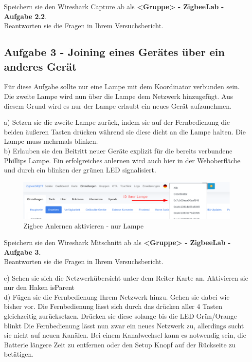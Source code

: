 \begin{Aufgabe}
    Speichern sie den Wireshark Capture ab als \textbf{\grqq <Gruppe> - ZigbeeLab - Aufgabe 2.2\grqq{}}. \\
    Beantworten sie die Fragen in Ihrem Versuchsbericht.
\end{Aufgabe}

\subsection{Aufgabe 3 - Joining eines Gerätes über ein anderes Gerät}
Für diese Aufgabe sollte nur eine Lampe mit dem Koordinator verbunden sein. Die zweite Lampe wird nun über die Lampe dem Netzwerk hinzugefügt. Aus diesem Grund wird es nur der Lampe
erlaubt ein neues Gerät aufzunehmen. 

a) Setzen sie die zweite Lampe zurück, indem sie auf der Fernbedienung die beiden äußeren Tasten drücken während sie diese dicht an die Lampe halten. Die Lampe muss mehrmals blinken.\\
b) Erlauben sie den Beitritt neuer Geräte explizit für die bereits verbundene Phillips Lampe.
Ein erfolgreiches anlernen wird auch hier in der Weboberfläche und durch ein blinken der grünen LED signalisiert. 

\begin{figure}[H]
    \centering
    \includegraphics[width=1\textwidth]{media/Z2M-Anlernen-Lampe.png}
    \caption{Zigbee Anlernen aktivieren - nur Lampe}
\end{figure}

\begin{Aufgabe}
    Speichern sie den Wireshark Mitschnitt ab als \textbf{\grqq <Gruppe> - ZigbeeLab - Aufgabe 3\grqq{}}. \\
    Beantworten sie die Fragen in Ihrem Versuchsbericht.
\end{Aufgabe}

c) Sehen sie sich die Netzwerkübersicht unter dem Reiter \grqq Karte\grqq{} an. Aktivieren sie nur den Haken \grqq isParent\grqq{} \\
d) Fügen sie die Fernbedienung Ihrem Netzwerk hinzu. Gehen sie dabei wie bisher vor. Die Fernbedienung lässt sich durch das drücken aller 4 Tasten gleichzeitig zurücksetzen. Drücken sie diese solange bis die LED Grün/Orange blinkt
Die Fernbedienung lässt nun zwar ein neues Netzwerk zu, allerdings sucht sie nicht auf neuen Kanälen. Bei einem Kanalwechsel kann es notwendig sein, die Batterie längere Zeit zu entfernen oder den \grqq Setup \grqq{} Knopf auf der
Rückseite zu betätigen.\\

